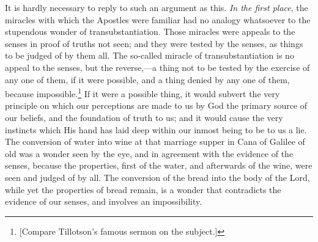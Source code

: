 \documentclass[english,]{book}
\begin{document}
It is hardly necessary to reply to such an argument as this. \emph{In the first place}, the miracles with which the Apostles were familiar had no analogy whatsoever to the stupendous wonder of transubstantiation. Those miracles were appeals to the senses in proof of truths not seen; and they were tested by the senses, as things to be judged of by them all. The so-called miracle of transubstantiation is no appeal to the senses, but the reverse,---a thing not to be tested by the exercise of any one of them, if it were possible, and a thing denied by any one of them, because impossible.\footnote{{[}Compare Tillotson's famous sermon on the subject.{]}} If it were a possible thing, it would subvert the very principle on which our perceptions are made to us by God the primary source of our beliefs, and the foundation of truth to us; and it would cause the very instincts which His hand has laid deep within our inmost being to be to us a lie. The conversion of water into wine at that marriage supper in Cana of Galilee of old was a wonder seen by the eye, and in agreement with the evidence of the senses, because the properties, first of the water, and afterwards of the wine, were seen and judged of by all. The conversion of the bread into the body of the Lord, while yet the properties of bread remain, is a wonder that contradicts the evidence of our senses, and involves an impossibility.
\end{document}
